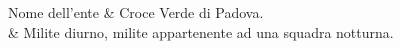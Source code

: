 {\small Nome dell'ente}							& Croce Verde di Padova.\\
\hspace{6.5pt}{\small Principali mansioni e responsabilit\`a}		& Milite diurno, milite appartenente ad una squadra notturna.\\
